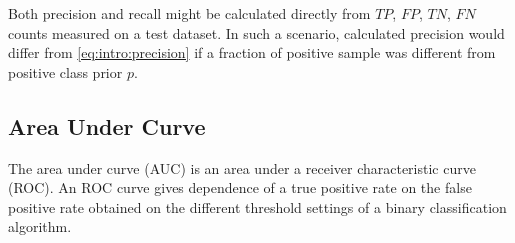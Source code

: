Both precision and recall might be calculated directly from $\mathit{TP}$,
$\mathit{FP}$, $\mathit{TN}$, $\mathit{FN}$ counts measured on a test dataset.
In such a scenario, calculated precision would differ from
\ref{eq:intro:precision} if a fraction of positive sample was different from
positive class prior $p$.

\subsection{Area Under Curve}

The area under curve (AUC) is an area under a receiver characteristic curve
(ROC). An ROC curve gives dependence of a true positive rate on the false
positive rate obtained on the different threshold settings of a binary
classification algorithm.
